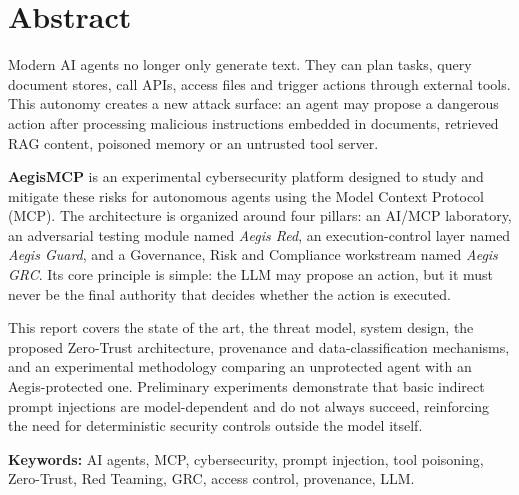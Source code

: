 \documentclass[12pt,a4paper,oneside]{report}
\newcommand{\Aegis}{\textbf{AegisMCP}}
\newcommand{\Guard}{\textit{Aegis Guard}}
\newcommand{\Red}{\textit{Aegis Red}}
\newcommand{\GRC}{\textit{Aegis GRC}}
\begin{document}
\chapter*{Abstract}
Modern AI agents no longer only generate text. They can plan tasks, query document stores, call APIs, access files and trigger actions through external tools. This autonomy creates a new attack surface: an agent may propose a dangerous action after processing malicious instructions embedded in documents, retrieved RAG content, poisoned memory or an untrusted tool server.

\Aegis{} is an experimental cybersecurity platform designed to study and mitigate these risks for autonomous agents using the Model Context Protocol (MCP). The architecture is organized around four pillars: an AI/MCP laboratory, an adversarial testing module named \Red{}, an execution-control layer named \Guard{}, and a Governance, Risk and Compliance workstream named \GRC{}. Its core principle is simple: the LLM may propose an action, but it must never be the final authority that decides whether the action is executed.

This report covers the state of the art, the threat model, system design, the proposed Zero-Trust architecture, provenance and data-classification mechanisms, and an experimental methodology comparing an unprotected agent with an Aegis-protected one. Preliminary experiments demonstrate that basic indirect prompt injections are model-dependent and do not always succeed, reinforcing the need for deterministic security controls outside the model itself.

\textbf{Keywords:} AI agents, MCP, cybersecurity, prompt injection, tool poisoning, Zero-Trust, Red Teaming, GRC, access control, provenance, LLM.

\tableofcontents
\clearpage

\listoffigures
{}
\clearpage

\listoftables
{}
\clearpage
\end{document}
